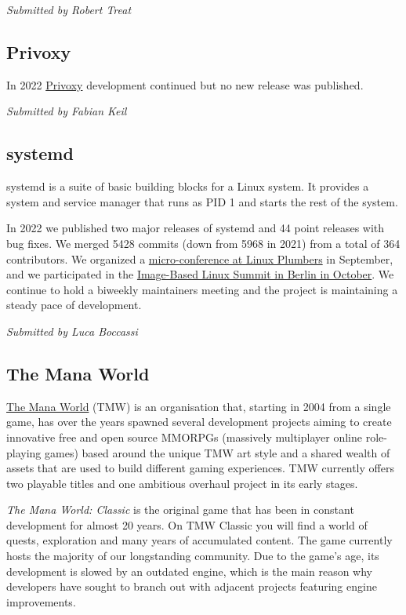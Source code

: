 \documentclass[a4paper]{report}
\begin{document}
{\em Submitted by Robert Treat}

\subsection{Privoxy}

In 2022 \href{https://www.privoxy.org/}{Privoxy} development continued but no new release was published.

{\em Submitted by Fabian Keil}

\subsection{systemd}

systemd is a suite of basic building blocks for a Linux system. It provides a system and service manager that runs as PID 1 and starts the rest of the system.

In 2022 we published two major releases of systemd and 44 point releases with bug fixes. We merged 5428 commits (down from 5968 in 2021) from a total of 364 contributors. We organized a \href{https://lpc.events/event/16/sessions/146/#20220912}{micro-conference at Linux Plumbers} in September, and we participated in the \href{https://uapi-group.org/docs/minutes/2022-10-05__image-based-linux-summit/}{Image-Based Linux Summit in Berlin in October}. We continue to hold a biweekly maintainers meeting and the project is maintaining a steady pace of development.

{\em Submitted by Luca Boccassi}

\subsection{The Mana World}

\href{https://www.themanaworld.org/about}{The Mana World} (TMW) is an organisation that, starting in 2004 from a single game, has over the years spawned several development projects aiming to create innovative free and open source MMORPGs (massively multiplayer online role-playing games) based around the unique TMW art style and a shared wealth of assets that are used to build different gaming experiences. TMW currently offers two playable titles and one ambitious overhaul project in its early stages.

{\em The Mana World: Classic} is the original game that has been in constant development for almost 20 years. On TMW Classic you will find a world of quests, exploration and many years of accumulated content. The game currently hosts the majority of our longstanding community. Due to the game's age, its development is slowed by an outdated engine, which is the main reason why developers have sought to branch out with adjacent projects featuring engine improvements.
\end{document}
